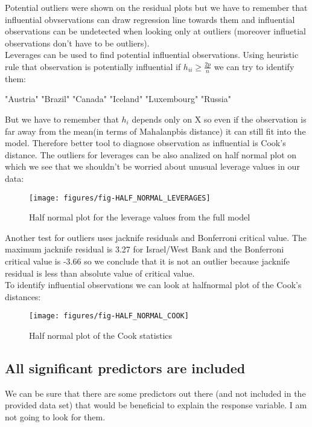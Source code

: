 \documentclass[a4paper]{article}
\begin{document}
Potential outliers were shown on the residual plots but we have to remember
that influential obvservations can draw regression line towards them and
influential observations can be undetected when looking only at outliers
(moreover influetial observations don't have to be outliers).\\
Leverages can be used to find potential influential observations. Using
heuristic rule that observation is potentially influential if $h_{ii}\geq \frac{2p}{n}$ we can try to identify them:
\begin{Schunk}
\begin{Soutput}
[1] "Austria"    "Brazil"     "Canada"     "Iceland"    "Luxembourg" "Russia"    
\end{Soutput}
\end{Schunk}
But we have to remember that $h_i$ depends only on X so even if the observation
is far away from the mean(in terms of Mahalanpbis distance) it can still fit
into the model. Therefore better tool to diagnose observation as influential is
Cook's distance.
The outliers for leverages can be also analized on half normal plot on which we
see that we shouldn't be worried about unusual leverage values in our data:
\begin{figure}[H]
\begin{center}
\texttt{[image: figures/fig-HALF\_NORMAL\_LEVERAGES]}
\caption{Half normal plot for the leverage values from the full model}
\end{center}
\end{figure}
Another test for outliers uses jacknife residuals and Bonferroni critical value.
The maximum jacknife residual is 3.27 for
Israel/West Bank and the Bonferroni critical value is
-3.66
so we conclude that it is not an outlier because jacknife residual is less than
absolute value of critical value.\\
To identify influential observations we can look at halfnormal plot of the
Cook's distances:
\begin{figure}[H]
\begin{center}
\texttt{[image: figures/fig-HALF\_NORMAL\_COOK]}
\caption{Half normal plot of the Cook statistics}
\end{center}
\end{figure}
  
  \subsection{All significant predictors are included}
  We can be sure that there are some predictors out there (and not included in
  the provided data set) that would be beneficial to explain the response
  variable. I am not going to look for them.
\end{document}
